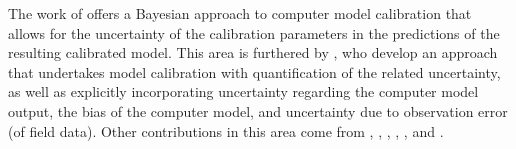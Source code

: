 \documentclass{article}
\begin{document}
The work of \cite{Kennedy2001} offers a Bayesian approach to computer model calibration that allows for the uncertainty of the calibration parameters in the predictions of the resulting calibrated model. 
This area is furthered by \cite{Higdon2004}, who develop an approach that undertakes model calibration with quantification of the related uncertainty, as well as explicitly incorporating uncertainty regarding the computer model output, the bias of the computer model, and uncertainty due to observation error (of field data). Other contributions in this area come from \cite{Williams2006}, \cite{Bayarri}, \cite{Liu2009}, \cite{Bayarri2007}, \cite{Brynjarsdottir2014}, and \cite{Brown2016}.

\end{document}
